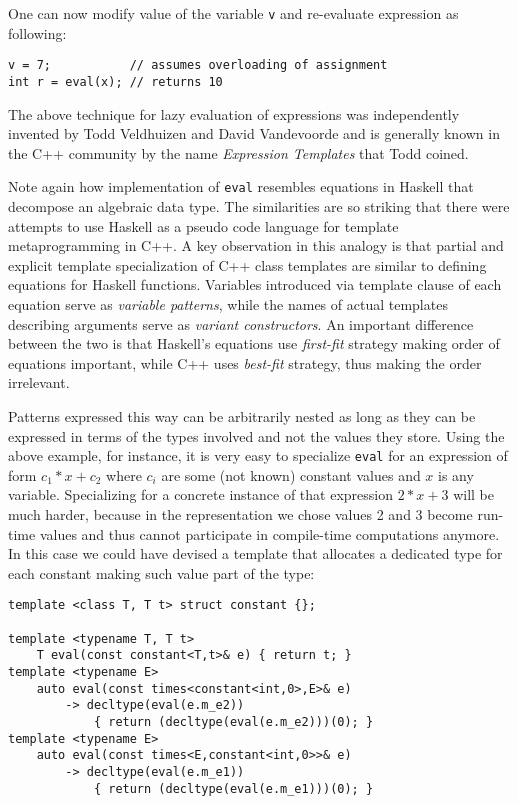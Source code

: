 \documentclass[preprint]{sigplanconf}
\makeatletter
\DeclareRobustCommand{\code}[1]{{\lstinline[breaklines=false,escapechar=@]{#1}}}
\makeatother
\begin{document}
\noindent One can now modify value of the variable \code{v} and re-evaluate 
expression as following:

\begin{lstlisting}
v = 7;           // assumes overloading of assignment
int r = eval(x); // returns 10
\end{lstlisting}

\noindent The above technique for lazy evaluation of expressions was 
independently invented by Todd Veldhuizen and David Vandevoorde and is generally 
known in the C++ community by the name \emph{Expression Templates} that Todd 
coined\cite{Veldhuizen95expressiontemplates, vandevoorde2003c++}.  

Note again how implementation of \code{eval} resembles equations in Haskell that 
decompose an algebraic data type. The similarities are so striking that there 
were attempts to use Haskell as a pseudo code language for template 
metaprogramming in C++\cite{Milewski11}. A key observation in this analogy is 
that partial and explicit template specialization of C++ class templates are 
similar to defining equations for Haskell functions. Variables introduced via 
template clause of each equation serve as \emph{variable patterns}, while the 
names of actual templates describing arguments serve as \emph{variant 
constructors}. An important difference between the two is that Haskell's 
equations use \emph{first-fit} strategy making order of equations important, 
while C++ uses \emph{best-fit} strategy, thus making the order irrelevant.

Patterns expressed this way can be arbitrarily nested as long as they can be 
expressed in terms of the types involved and not the values they store. Using 
the above example, for instance, it is very easy to specialize \code{eval} for 
an expression of form $c_1*x+c_2$ where $c_i$ are some (not known) constant 
values and $x$ is any variable. Specializing for a concrete instance of that 
expression $2*x+3$ will be much harder, because in the representation we chose 
values 2 and 3 become run-time values and thus cannot participate in 
compile-time computations anymore. In this case we could have devised a template 
that allocates a dedicated type for each constant making such value part of the 
type:

\begin{lstlisting}[keepspaces,columns=flexible]
template <class T, T t> struct constant {};

template <typename T, T t>
    T eval(const constant<T,t>& e) { return t; }
template <typename E>
    auto eval(const times<constant<int,0>,E>& e) 
        -> decltype(eval(e.m_e2)) 
            { return (decltype(eval(e.m_e2)))(0); }
template <typename E>
    auto eval(const times<E,constant<int,0>>& e) 
        -> decltype(eval(e.m_e1)) 
            { return (decltype(eval(e.m_e1)))(0); }
\end{lstlisting}
\end{document}

